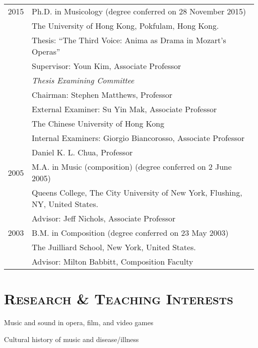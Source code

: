 \documentclass[a4paper,11pt]{article}
\begin{document}
  \hspace*{-0.25cm}
  \begin{tabular}{p{2.5cm} l}
    2015 & Ph.D. in Musicology (degree conferred on 28 November 2015)\\
    & The University of Hong Kong, Pokfulam, Hong Kong.\\
    & Thesis: ``The Third Voice: Anima as Drama in Mozart's Operas''\\
    & Supervisor: Youn Kim, Associate Professor\\[2mm]
    & \textit{Thesis Examining Committee}\\
    & Chairman: Stephen Matthews, Professor\\
    & External Examiner: Su Yin Mak, Associate Professor\\
    & \hspace*{28.5mm} The Chinese University of Hong Kong\\
    & Internal Examiners: Giorgio Biancorosso, Associate Professor\\
    & \hspace*{29.5mm} Daniel K. L. Chua, Professor\\[2mm]
    
	2005 & M.A. in Music (composition) (degree conferred on 2 June 2005)\\
	& Queens College, The City University of New York, Flushing, NY, United States.\\
	& Advisor: Jeff Nichols, Associate Professor\\[2mm]

    2003 & B.M. in Composition (degree conferred on 23 May 2003)\\
    & The Juilliard School, New York, United States.\\
    & Advisor: Milton Babbitt, Composition Faculty
  \end{tabular}
  
  \vspace{2.5mm}
  
  \section*{\textsc{Research \& Teaching Interests}}
  
  \hspace{2mm} \textbullet \hspace{2mm} Music and sound in opera, film, and video games
  
  \noindent \hspace{2mm} \textbullet \hspace{2mm} Cultural history of music and disease/illness
  
\end{document}

